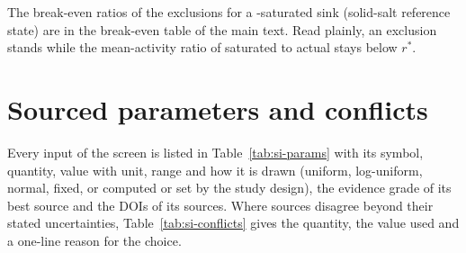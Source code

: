 The break-even ratios of the exclusions for a -saturated sink (solid-salt reference state) are in the break-even table of the main text. %
Read plainly, an exclusion stands while the mean-activity ratio of saturated to actual  stays below $r^*$. %

\onecolumn
\section{Sourced parameters and conflicts}\label{si:sourced}\label{si:parameters}
Every input of the screen is listed in Table~\ref{tab:si-params} with its symbol, quantity, value with unit, range and how it is drawn (uniform, log-uniform, normal, fixed, or computed or set by the study design), the evidence grade of its best source and the DOIs of its sources. %
Where sources disagree beyond their stated uncertainties, Table~\ref{tab:si-conflicts} gives the quantity, the value used and a one-line reason for the choice. %
\begingroup\scriptsize\setlength{\tabcolsep}{2.5pt}%


\endgroup
\twocolumn

\balance




